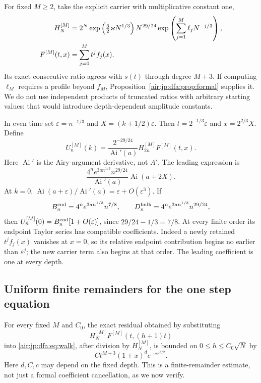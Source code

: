 \documentclass[11pt,letterpaper]{article}
\numberwithin{equation}{section}
\theoremstyle{remark}
\newcommand{\Ai}{\operatorname{Ai}}
\newcommand{\eps}{\varepsilon}
\begin{document}
For fixed $M\ge2$, take the explicit carrier with multiplicative constant one,
\begin{align}
 H_N^{[M]}&=2^N\exp\left(\tfrac32\varkappa N^{1/3}\right)N^{29/24}
 \exp\left(\sum_{j=1}^M\ell_jN^{-j/3}\right),\label{air:jp:dfa:eq:carrier}\\
 F^{[M]}(t,x)&=\sum_{j=0}^Mt^jf_j(x).\notag
\end{align}
Its exact consecutive ratio agrees with $s(t)$ through degree $M+3$. If computing $\ell_M$ requires a profile beyond $f_M$, Proposition~\ref{air:jp:dfa:prop:formal} supplies it. We do not use independent products of truncated ratios with arbitrary starting values: that would introduce depth-dependent amplitude constants.

In even time set $\eps=n^{-1/3}$ and $X=(k+1/2)\eps$. Then $t=2^{-1/3}\eps$ and $x=2^{2/3}X$. Define
\begin{equation}\label{air:jp:dfa:eq:U}
 U_n^{[M]}(k)=\frac{2^{-29/24}}{\Ai'(a)}H_{2n}^{[M]}F^{[M]}(t,x).
\end{equation}
Here $\Ai'$ is the Airy-argument derivative, not $A'$. The leading expression is
\[
 \frac{4^ne^{3an^{1/3}}n^{29/24}}{\Ai'(a)}\Ai(a+2X).
\]
At $k=0$, $\Ai(a+\eps)/\Ai'(a)=\eps+O(\eps^3)$. If
\begin{equation}\label{air:jp:dfa:eq:scales}
 B_n^{\rm end}=4^ne^{3an^{1/3}}n^{7/8},\qquad
 D_n^{\rm bulk}=4^ne^{3an^{1/3}}n^{29/24},
\end{equation}
then $U_n^{[M]}(0)=B_n^{\rm end}[1+O(\eps)]$, since $29/24-1/3=7/8$. At every finite order its endpoint Taylor series has compatible coefficients. Indeed a newly retained $t^jf_j(x)$ vanishes at $x=0$, so its relative endpoint contribution begins no earlier than $\eps^j$; the new carrier term also begins at that order. The leading coefficient is one at every depth.

\subsection{Uniform finite remainders for the one step equation}
For every fixed $M$ and $C_0$, the exact residual obtained by substituting
\[
 H_N^{[M]}F^{[M]}(t,(h+1)t)
\]
into \eqref{air:jp:dfa:eq:walk}, after division by $H_N^{[M]}$, is bounded on $0\le h\le C_0\sqrt N$ by
\begin{equation}\label{air:jp:dfa:eq:onestepresidual}
 Ct^{M+3}(1+x)^d e^{-cx^{3/2}}.
\end{equation}
Here $d,C,c$ may depend on the fixed depth. This is a finite-remainder estimate, not just a formal coefficient cancellation, as we now verify.
\end{document}
